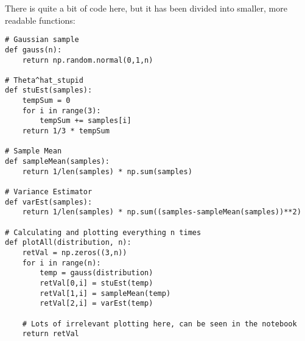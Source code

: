 There is quite a bit of code here, but it has been divided into smaller, more readable functions:
\begin{verbatim}
# Gaussian sample
def gauss(n):
    return np.random.normal(0,1,n)

# Theta^hat_stupid
def stuEst(samples):
    tempSum = 0
    for i in range(3):
        tempSum += samples[i]
    return 1/3 * tempSum

# Sample Mean
def sampleMean(samples):
    return 1/len(samples) * np.sum(samples)

# Variance Estimator
def varEst(samples):
    return 1/len(samples) * np.sum((samples-sampleMean(samples))**2)

# Calculating and plotting everything n times
def plotAll(distribution, n):
    retVal = np.zeros((3,n))
    for i in range(n):
        temp = gauss(distribution)
        retVal[0,i] = stuEst(temp)
        retVal[1,i] = sampleMean(temp)
        retVal[2,i] = varEst(temp)
    
    # Lots of irrelevant plotting here, can be seen in the notebook
    return retVal
\end{verbatim}